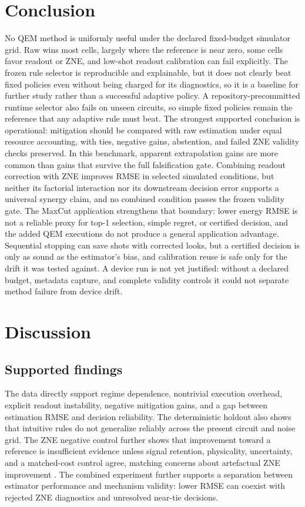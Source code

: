 \documentclass[10pt,twocolumn]{article}
\begin{document}
\section{Conclusion}
No QEM method is uniformly useful under the declared fixed-budget simulator grid.
Raw wins most cells, largely where the reference is near zero, some cells favor readout or
ZNE, and low-shot readout calibration can fail explicitly. The frozen rule selector is
reproducible and explainable, but it does not clearly beat fixed policies even without being
charged for its diagnostics, so it is a baseline for further study rather than a successful
adaptive policy. A repository-precommitted runtime selector also fails on unseen circuits, so simple fixed
policies remain the reference that any adaptive rule must beat. The strongest supported
conclusion is operational: mitigation should be compared with raw estimation under
equal resource accounting, with ties, negative gains, abstention, and failed ZNE
validity checks preserved. In this benchmark, apparent extrapolation gains are more
common than gains that survive the full falsification gate. Combining readout
correction with ZNE improves RMSE in selected simulated conditions, but neither its
factorial interaction nor its downstream decision error supports a universal synergy
claim, and no combined condition passes the frozen validity gate.
The MaxCut application strengthens that boundary: lower energy RMSE is not a reliable
proxy for top-1 selection, simple regret, or certified decision, and the added QEM
executions do not produce a general application advantage.
Sequential stopping can save shots with corrected looks, but a certified decision is only as
sound as the estimator's bias, and calibration reuse is safe only for the drift it was tested
against. A device run is not yet justified: without a declared budget, metadata capture, and
complete validity controls it could not separate method failure from device drift.

\section{Discussion}
\subsection{Supported findings}
The data directly support regime dependence, nontrivial execution overhead, explicit
readout instability, negative mitigation gains, and a gap between estimation RMSE
and decision reliability. The deterministic holdout also shows that intuitive rules
do not generalize reliably across the present circuit and noise grid. The ZNE
negative control further shows that improvement toward a reference is insufficient
evidence unless signal retention, physicality, uncertainty, and a matched-cost
control agree, matching concerns about artefactual ZNE improvement
\cite{koster2026}. The combined experiment further supports a separation between
estimator performance and mechanism validity: lower RMSE can coexist with rejected
ZNE diagnostics and unresolved near-tie decisions.
\end{document}
